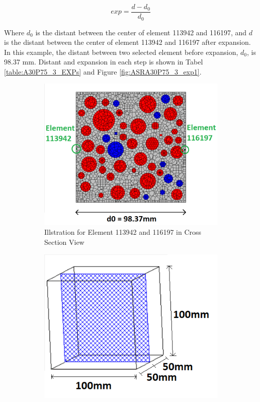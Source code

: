 \begin{equation}
  exp = \frac{d-d_0}{d_0}
\end{equation}


Where $d_0$ is the distant between the center of element 113942 and 116197, and $d$ is the distant between the center of element 113942 and 116197 after expansion. In this example, the distant between two selected element before expansion, $d_0$, is 98.37 mm. Distant and expansion in each step is shown in Tabel \ref{table:A30P75_3_EXPs} and Figure \ref{fig:ASRA30P75_3_exp1}.

\begin{figure}[!h]
\centering
\begin{subfigure}{.5\textwidth}
  \centering
  \includegraphics[width=1.0\linewidth]{Files/Method/exp2D.png}
  \caption{Illstration for Element 113942 and 116197 in Cross Section View}
\end{subfigure}%
\begin{subfigure}{.5\textwidth}
  \centering
  \includegraphics[width=1.0\linewidth]{Files/Method/exp3D.png}

\end{subfigure}
\end{figure}
